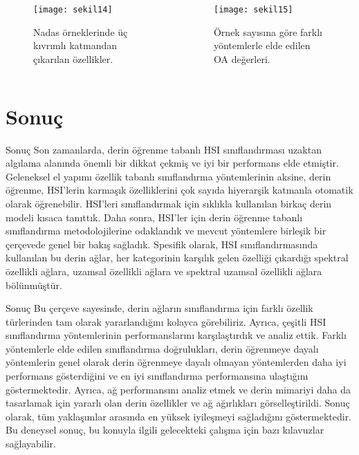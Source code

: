 \documentclass{beamer}
\begin{document}
\begin{frame}

	\begin{columns}
		\begin{column}{0.4\textwidth}
			\begin{figure}[htbp]
				\texttt{[image: sekil14]}
				\caption{Nadas örneklerinde üç kıvrımlı katmandan çıkarılan özellikler.}
				\label{fig:sekil9}
			\end{figure}
		\end{column}

		\begin{column}{0.7\textwidth}
			\begin{figure}[htbp]
				\texttt{[image: sekil15]}
				\caption{Örnek sayısına göre farklı yöntemlerle elde edilen OA değerleri.}
				\label{fig:sekil10}
			\end{figure}
		\end{column}
	\end{columns}
\end{frame}

\section{Sonuç}
\begin{frame}{Sonuç}
	Son zamanlarda, derin öğrenme tabanlı HSI sınıflandırması uzaktan algılama alanında önemli bir dikkat çekmiş ve iyi bir performans elde etmiştir. Geleneksel el yapımı özellik tabanlı sınıflandırma yöntemlerinin aksine, derin öğrenme, HSI’lerin karmaşık özelliklerini çok sayıda hiyerarşik katmanla otomatik olarak öğrenebilir. HSI'leri sınıflandırmak için sıklıkla kullanılan birkaç derin modeli kısaca tanıttık. Daha sonra, HSI’ler için derin öğrenme tabanlı sınıflandırma metodolojilerine odaklandık ve mevcut yöntemlere birleşik bir çerçevede genel bir bakış sağladık. Spesifik olarak, HSI sınıflandırmasında kullanılan bu derin ağlar, her kategorinin karşılık gelen özelliği çıkardığı spektral özellikli ağlara, uzamsal özellikli ağlara ve spektral uzamsal özellikli ağlara bölünmüştür. 
\end{frame}

\begin{frame}{Sonuç}
	Bu çerçeve sayesinde, derin ağların sınıflandırma için farklı özellik türlerinden tam olarak yararlandığını kolayca görebiliriz. Ayrıca, çeşitli HSI sınıflandırma yöntemlerinin performanslarını karşılaştırdık ve analiz ettik. Farklı yöntemlerle elde edilen sınıflandırma doğrulukları, derin öğrenmeye dayalı yöntemlerin genel olarak derin öğrenmeye dayalı olmayan yöntemlerden daha iyi performans gösterdiğini ve en iyi sınıflandırma performansına ulaştığını göstermektedir. Ayrıca, ağ performansını analiz etmek ve derin mimariyi daha da tasarlamak için yararlı olan derin özellikler ve ağ ağırlıkları görselleştirildi. Sonuç olarak, tüm yaklaşımlar arasında en yüksek iyileşmeyi sağladığını göstermektedir. Bu deneysel sonuç, bu konuyla ilgili gelecekteki çalışma için bazı kılavuzlar sağlayabilir. 
\end{frame}
\end{document}
